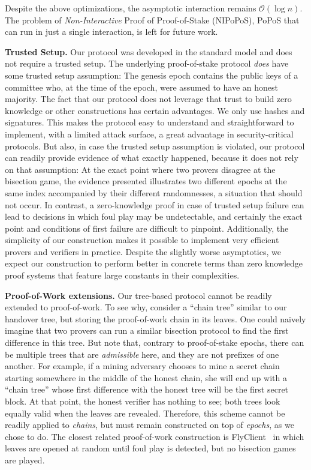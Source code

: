 Despite the above optimizations, the asymptotic interaction remains $\mathcal{O}(\log n)$.
The problem of \emph{Non-Interactive} Proof of Proof-of-Stake (NIPoPoS), PoPoS that can run in
just a single interaction, is left for future work.

\noindent
\textbf{Trusted Setup.}
Our protocol was developed in the standard model and does not require a trusted setup.
The underlying proof-of-stake protocol \emph{does} have some trusted setup assumption:
The genesis epoch contains the public keys of a committee who, at the time of the epoch,
were assumed to have an honest majority. The fact that our protocol does not leverage that
trust to build zero knowledge or other constructions has certain advantages. We only use
hashes and signatures. This makes the protocol easy to understand and straightforward to implement,
with a limited attack surface, a great advantage in security-critical protocols. But also,
in case the trusted setup assumption is violated, our protocol can readily provide evidence
of what exactly happened, because it does not rely on that assumption: At the exact point
where two provers disagree at the bisection game, the evidence presented illustrates two
different epochs at the same index accompanied by their different randomnesses, a situation
that should not occur. In contrast,
a zero-knowledge proof in case of trusted setup failure can lead to decisions in which
foul play may be undetectable, and certainly the exact point and conditions of first
failure are difficult to pinpoint. Additionally, the simplicity of our construction makes
it possible to implement very efficient provers and verifiers in practice. Despite the
slightly worse asymptotics, we expect our construction to perform better in concrete
terms than zero knowledge proof systems that feature large constants in their complexities.

\noindent
\textbf{Proof-of-Work extensions.}
Our tree-based protocol cannot be readily extended to proof-of-work. To see why, consider
a ``chain tree'' similar to our handover tree, but storing the proof-of-work chain in its leaves.
One could na\"ively imagine that two provers can run a similar bisection protocol to
find the first difference in this tree. But note that, contrary to proof-of-stake epochs,
there can be multiple trees that are \emph{admissible} here, and they are not prefixes of one
another. For example, if a mining adversary chooses to mine a secret chain starting
somewhere in the middle of the honest chain, she will end up with a ``chain tree'' whose first
difference with the honest tree will be the first secret block. At that point, the honest
verifier has nothing to see; both trees look equally valid when the leaves are revealed. Therefore,
this scheme cannot be readily applied to \emph{chains}, but must remain constructed on top of
\emph{epochs}, as we chose to do. The closest related proof-of-work construction is FlyClient~\cite{flyclient}
in which leaves are opened at random until foul play is detected, but no bisection games
are played.
